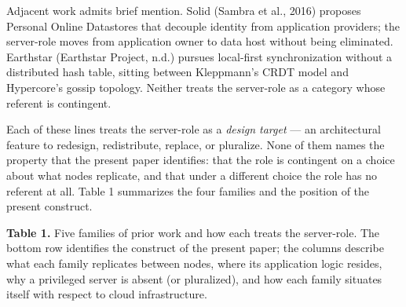 \documentclass[
]{article}
\begin{document}
Adjacent work admits brief mention. Solid (Sambra et al., 2016) proposes
Personal Online Datastores that decouple identity from application
providers; the server-role moves from application owner to data host
without being eliminated. Earthstar (Earthstar Project, n.d.) pursues
local-first synchronization without a distributed hash table, sitting
between Kleppmann's CRDT model and Hypercore's gossip topology. Neither
treats the server-role as a category whose referent is contingent.

Each of these lines treats the server-role as a \emph{design target} ---
an architectural feature to redesign, redistribute, replace, or
pluralize. None of them names the property that the present paper
identifies: that the role is contingent on a choice about what nodes
replicate, and that under a different choice the role has no referent at
all. Table 1 summarizes the four families and the position of the
present construct.

\textbf{Table 1.} Five families of prior work and how each treats the
server-role. The bottom row identifies the construct of the present
paper; the columns describe what each family replicates between nodes,
where its application logic resides, why a privileged server is absent
(or pluralized), and how each family situates itself with respect to
cloud infrastructure.
\end{document}
